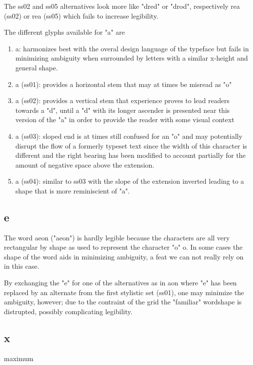 \documentclass[a4paper]{article}
\begin{document}
The ss02 and ss05 alternatives look more like "dred" or "drod", respectively
{re{\sstwo a}} (ss02) or
{re{\ssfive a}} (ss05)
which fails to increase legibility.

The different glyphs available for "a" are

\begin{enumerate}
  \item {\ssdefault a}: harmonizes best with the overal design language of the
    typeface but fails in minimizing ambiguity when surrounded by letters with
    a similar x-height and general shape.
  \item {\ssone a} (ss01): provides a horizontal stem that may at times be
    misread as "o"
  \item {\sstwo a} (ss02): provides a vertical stem that experience proves to
    lead readers towards a "d", until a "d" with its longer ascender is
    presented near this version of the "a" in order to provide the reader with
    some visual context
  \item {\ssthree a} (ss03): sloped end is at times still confused for an "o"
    and may potentially disrupt the flow of a formerly typeset text since the width
    of this character is different and the right bearing has been modified to
    account partially for the amount of negative space above the extension.
  \item {\ssfour a} (ss04): similar to ss03 with the slope of the extension
    inverted leading to a shape that is more reminiscient of "a".
\end{enumerate}

\subsection{e}
The word {\ssdefault aeon} ("aeon") is hardly legible because the characters
are all very rectangular by shape as used to represent the character "o"
{\ssdefault o}. In some cases the shape of the word aids in minimizing
ambiguity, a feat we can not really rely on in this case.

By exchanging the "e" for one of the alternatives as in
{\ssdefault aon} where "e" has been replaced by an alternate from the
first stylistic set (ss01), one may minimize the ambiguity, however; due to the
contraint of the grid the "familiar" wordshape is distrupted, possibly
complicating legibility.

\subsection{x}
{\ssdefault maximum}
\end{document}
